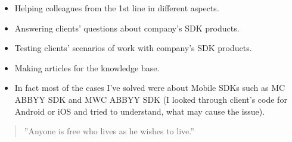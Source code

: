\documentclass[10pt,a4paper,ragged2e]{altacv}
\begin{document}
\begin{paracol}{2}

\begin{itemize}
\item Helping colleagues from the 1st line in different aspects.
\item Answering clients' questions about company's SDK products.
\item Testing clients' scenarios of work with company's SDK products.
\item Making articles for the knowledge base.

\divider

\item In fact most of the cases I've solved were about Mobile SDKs such as MC ABBYY SDK and MWC ABBYY SDK (I looked through client's code for Android or iOS and tried to understand, what may cause the issue).
\end{itemize}


\smallskip
\smallskip
\smallskip
\smallskip


\divider

\divider


\smallskip
\smallskip
\smallskip
\smallskip



\newpage


\switchcolumn


\begin{quote}
''Anyone is free who lives as he wishes to live.''


\end{quote}
\end{paracol}
\end{document}
